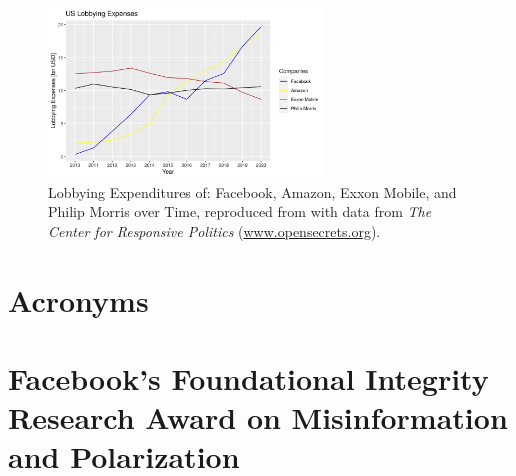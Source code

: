 \begin{figure}
    \centering
    \includegraphics[width=0.65\textwidth]{figures/Lobbying_Expenditures.png}
    \caption{Lobbying Expenditures of: Facebook, Amazon, Exxon Mobile, and Philip Morris over Time, reproduced from \citep{chung_big_2021} with data from \textit{The Center for Responsive Politics} (\href{https://www.opensecrets.org/}{www.opensecrets.org}).}
    \label{fig:lob_exp}
\end{figure}

\section{Acronyms}
\renewcommand{\glossarysection}[2][]{}
\printglossary[type=acronym]
\newpage

\section{Facebook's Foundational Integrity Research Award on Misinformation and Polarization}
\label{sec:deep}
